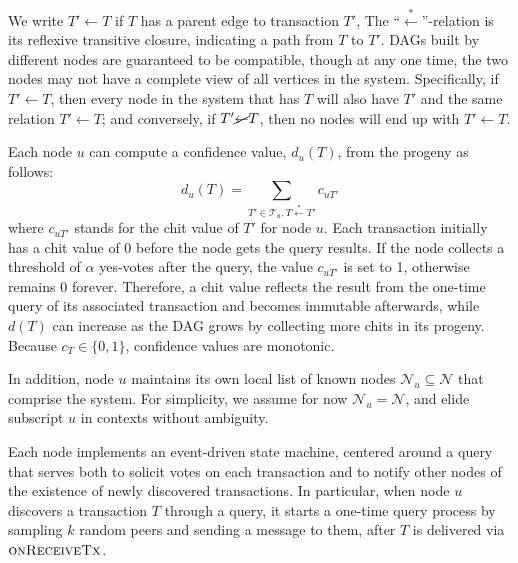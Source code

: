 We write $T' \gets T$ if $T$ has a parent edge to transaction $T'$,
The ``$\stackrel{*}{\gets}$''-relation is its reflexive transitive closure, indicating a path from $T$ to $T'$.
DAGs built by different nodes are guaranteed to be compatible, though at any one time, the two nodes may not have a complete view of all vertices in the system.
Specifically, if $T' \gets T$, then every node in the system that has $T$ will also have $T'$ and the same relation $T' \gets T$; and conversely, if $T' \cancel{\gets} T$, then no nodes will end up with $T' \gets T$.

Each node $u$ can compute a confidence value, $d_u(T)$, from the progeny as follows:
\[ d_u(T) = \sum_{T' \in \mathcal{T}_u, T \stackrel{*}{\gets} T'}c_{uT'}\]
where $c_{uT'}$ stands for the chit value of $T'$ for node $u$. Each transaction initially has a chit value of $0$ before the node gets
the query results. If the node collects a threshold of $\alpha$ yes-votes after the query, the value $c_{uT'}$ is set to 1, otherwise remains $0$ forever.
Therefore, a chit value reflects the result from the one-time query of its associated transaction and becomes immutable afterwards, while $d(T)$ can increase as the DAG grows by collecting more chits in its progeny.
Because $c_T \in \{0, 1\}$, confidence values are monotonic.

In addition, node $u$ maintains its own local list of known nodes $\mathcal{N}_u \subseteq \mathcal{N}$ that comprise the system.
For simplicity, we assume for now $\mathcal{N}_u = \mathcal{N}$, and elide subscript $u$ in contexts without ambiguity.
%

Each node implements an event-driven state machine, centered around a query that serves both to solicit votes on each transaction and to notify other nodes of the existence of newly discovered transactions.
In particular, when node $u$ discovers a transaction $T$ through a query, it starts a one-time query process by sampling $k$ random peers and sending a message to them, after $T$ is delivered via $\textsc{onReceiveTx}$.

